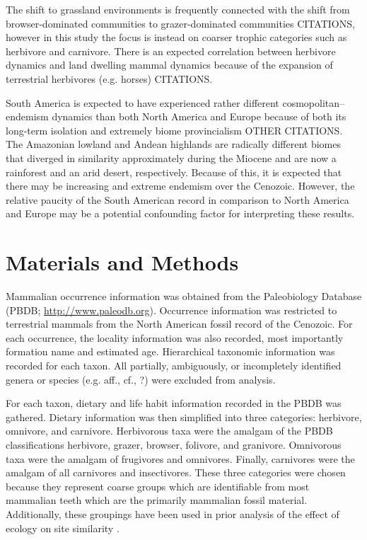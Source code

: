 \documentclass[12pt,letterpaper]{article}
\begin{document}
The shift to grassland environments is frequently connected with the shift from browser-dominated communities to grazer-dominated communities CITATIONS, however in this study the focus is instead on coarser trophic categories such as herbivore and carnivore. There is an expected correlation between herbivore dynamics and land dwelling mammal dynamics because of the expansion of terrestrial herbivores (e.g. horses) CITATIONS.

South America is expected to have experienced rather different cosmopolitan--endemism dynamics than both North America and Europe because of both its long-term isolation and extremely biome provincialism \citep{Flynn1998a,Macfadden2006} OTHER CITATIONS. The Amazonian lowland and Andean highlands are radically different biomes that diverged in similarity approximately during the Miocene \citep{Pascual1990,Ortiz-Jaureguizar2006} and are now a rainforest and an arid desert, respectively. Because of this, it is expected that there may be increasing and extreme endemism over the Cenozoic. However, the relative paucity of the South American record in comparison to North America and Europe may be a potential confounding factor for interpreting these results.




\section{Materials and Methods}
Mammalian occurrence information was obtained from the Paleobiology Database (PBDB; \url{http://www.paleodb.org}). Occurrence information was restricted to terrestrial mammals from the North American fossil record of the Cenozoic. For each occurrence, the locality information was also recorded, most importantly formation name and estimated age. Hierarchical taxonomic information was recorded for each taxon. All partially, ambiguously, or incompletely identified genera or species (e.g. aff., cf., ?) were excluded from analysis. 


For each taxon, dietary and life habit information recorded in the PBDB was gathered. Dietary information was then simplified into three categories: herbivore, omnivore, and carnivore. Herbivorous taxa were the amalgam of the PBDB classifications herbivore, grazer, browser, folivore, and granivore. Omnivorous taxa were the amalgam of frugivores and omnivores. Finally, carnivores were the amalgam of all carnivores and insectivores. These three categories were chosen because they represent coarse groups which are identifiable from most mammalian teeth which are the primarily mammalian fossil material. Additionally, these groupings have been used in prior analysis of the effect of ecology on site similarity \citep{Jernvall2004}.
\end{document}
